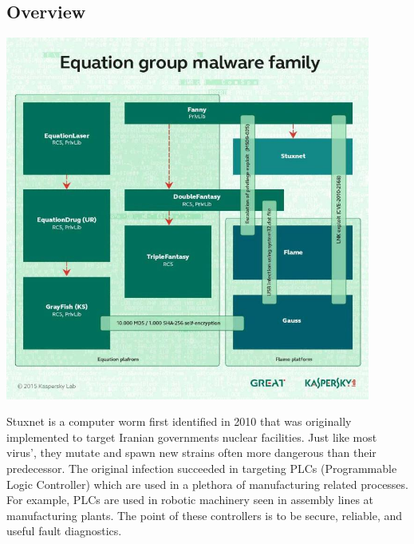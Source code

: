 \documentclass[12pt, letterpaper]{article}
\begin{document}
\begin{sloppypar}


\begin{flushleft}
\section{Overview}
\begin{center}
{\includegraphics[width=0.9\textwidth]{equation_group_family.jpg}}
\end{center}
Stuxnet is a computer worm first identified in 2010 that was originally
implemented to target Iranian governments nuclear facilities. Just like 
most virus', they mutate and spawn new strains often more dangerous than
their predecessor. The original infection succeeded in targeting PLCs
(Programmable Logic Controller) which are used in a plethora of 
manufacturing related processes. For example, PLCs are used in robotic
machinery seen in assembly lines at manufacturing plants. The point of 
these controllers is to be secure, reliable, and useful fault diagnostics. 


\end{flushleft}
\end{sloppypar}
\end{document}
